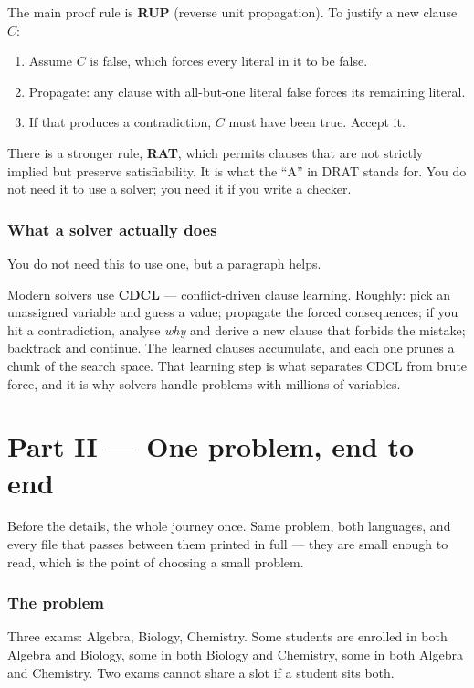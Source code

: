 \documentclass[11pt,a4paper]{article}
\begin{document}
The main proof rule is \textbf{RUP} (reverse unit propagation). To justify a
new clause $C$:

\begin{enumerate}
\item Assume $C$ is false, which forces every literal in it to be false.
\item Propagate: any clause with all-but-one literal false forces its remaining
      literal.
\item If that produces a contradiction, $C$ must have been true. Accept it.
\end{enumerate}

There is a stronger rule, \textbf{RAT}, which permits clauses that are not
strictly implied but preserve satisfiability. It is what the ``A'' in DRAT
stands for. You do not need it to use a solver; you need it if you write a
checker.

\section{What a solver actually does}

You do not need this to use one, but a paragraph helps.

Modern solvers use \textbf{CDCL} --- conflict-driven clause learning. Roughly:
pick an unassigned variable and guess a value; propagate the forced
consequences; if you hit a contradiction, analyse \emph{why} and derive a new
clause that forbids the mistake; backtrack and continue. The learned clauses
accumulate, and each one prunes a chunk of the search space. That learning step
is what separates CDCL from brute force, and it is why solvers handle problems
with millions of variables.

\newpage
\part*{Part II --- One problem, end to end}

Before the details, the whole journey once. Same problem, both languages, and
every file that passes between them printed in full --- they are small enough
to read, which is the point of choosing a small problem.

\section{The problem}

Three exams: Algebra, Biology, Chemistry. Some students are enrolled in both
Algebra and Biology, some in both Biology and Chemistry, some in both Algebra
and Chemistry. Two exams cannot share a slot if a student sits both.
\end{document}
